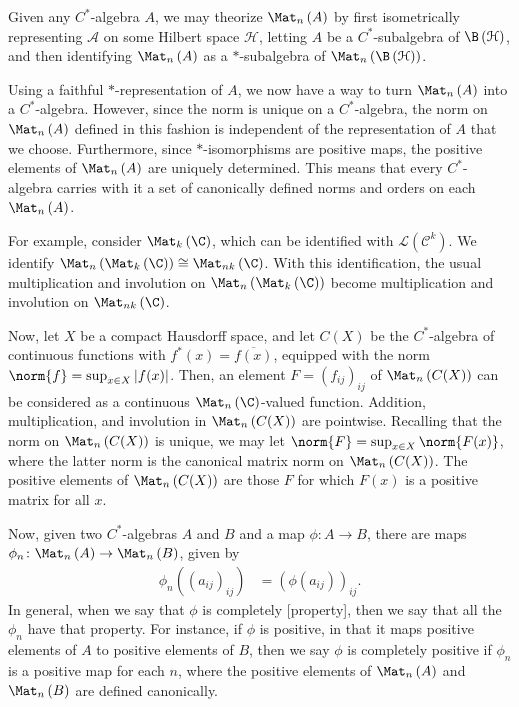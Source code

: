 \documentclass[10pt]{mypackage}
\begin{document}
Given any $C^{\ast}$-algebra $A$, we may theorize $\Mat_n\left( A \right)$ by first isometrically representing $\mathcal{A}$ on some Hilbert space $\mathcal{H}$, letting $A$ be a $C^{\ast}$-subalgebra of $\B\left( \mathcal{H} \right)$, and then identifying $\Mat_n\left( A \right)$ as a $\ast$-subalgebra of $\Mat_n\left( \B\left( \mathcal{H} \right) \right)$.\newline

Using a faithful $\ast$-representation of $A$, we now have a way to turn $\Mat_n\left( A \right)$ into a $C^{\ast}$-algebra. However, since the norm is unique on a $C^{\ast}$-algebra, the norm on $\Mat_n\left( A \right)$ defined in this fashion is independent of the representation of $A$ that we choose. Furthermore, since $\ast$-isomorphisms are positive maps, the positive elements of $\Mat_n\left( A \right)$ are uniquely determined. This means that every $C^{\ast}$-algebra carries with it a set of canonically defined norms and orders on each $\Mat_n\left( A \right)$.\newline

For example, consider $\Mat_k\left( \C \right)$, which can be identified with $\mathcal{L}\left( \mathcal{C}^{k} \right)$. We identify $\Mat_n\left( \Mat_{k}\left( \C \right) \right) \cong \Mat_{nk}\left( \C \right)$. With this identification, the usual multiplication and involution on $\Mat_n\left( \Mat_k\left( \C \right) \right)$ become multiplication and involution on $\Mat_{nk}\left( \C \right)$.\newline

Now, let $X$ be a compact Hausdorff space, and let $C(X)$ be the $C^{\ast}$-algebra of continuous functions with $f^{\ast}\left( x \right) = \overline{f(x)}$, equipped with the norm $\norm{f} = \sup_{x\in X}\left\vert f(x) \right\vert$. Then, an element $F = \left( f_{ij} \right)_{ij}$ of $\Mat_n\left( C(X) \right)$ can be considered as a continuous $\Mat_n\left( \C \right)$-valued function. Addition, multiplication, and involution in $\Mat_n\left( C(X) \right)$ are pointwise. Recalling that the norm on $\Mat_n\left( C(X) \right)$ is unique, we may let $\norm{F} = \sup_{x\in X}\norm{F(x)}$, where the latter norm is the canonical matrix norm on $\Mat_n\left( C(X) \right)$. The positive elements of $\Mat_n\left( C(X) \right)$ are those $F$ for which $F(x)$ is a positive matrix for all $x$.\newline

Now, given two $C^{\ast}$-algebras $A$ and $B$ and a map $\phi\colon A\rightarrow B$, there are maps $\phi_n\colon \Mat_n\left( A \right)\rightarrow \Mat_n\left( B \right)$, given by
\begin{align*}
  \phi_n\left( \left( a_{ij} \right)_{ij} \right) &= \left( \phi\left( a_{ij} \right) \right)_{ij}.
\end{align*}
In general, when we say that $\phi$ is completely [property], then we say that all the $\phi_n$ have that property. For instance, if $\phi$ is positive, in that it maps positive elements of $A$ to positive elements of $B$, then we say $\phi$ is completely positive if $\phi_n$ is a positive map for each $n$, where the positive elements of $\Mat_n\left( A \right)$ and $\Mat_n\left( B \right)$ are defined canonically.\newline
\end{document}
